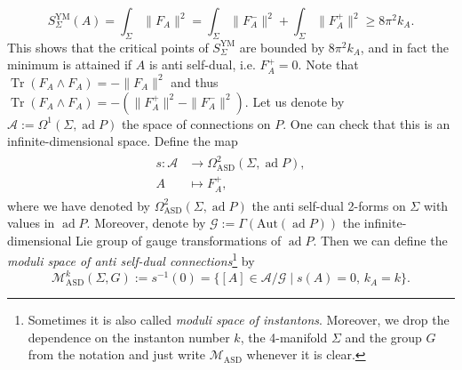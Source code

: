\documentclass[11pt,colorinlistoftodos]{amsart}
\numberwithin{equation}{subsection}
\theoremstyle{plain}
\theoremstyle{definition}
\theoremstyle{remark}
\DeclareMathOperator{\tr}{Tr}
\DeclareMathOperator{\ad}{ad}
\newcommand{\calM}{\mathcal{M}}
\begin{document}
\begin{equation}
    S^\mathrm{YM}_\Sigma(A)=\int_\Sigma\|F_A\|^2=\int_\Sigma\|F_A^-\|^2+\int_\Sigma \|F_A^+\|^2\geq 8\pi^2k_A.
\end{equation}
This shows that the critical points of $S^\mathrm{YM}_\Sigma$ are bounded by $8\pi^2 k_A$, and in fact the minimum is attained if $A$ is anti self-dual, i.e. $F_A^+=0$. Note that $\tr(F_A\land F_A)=-\|F_A\|^2$ and thus $\tr(F_A\land F_A)=-\left(\|F_A^+\|^2-\|F_A^-\|^2\right)$.
Let us denote by $\mathcal{A}:=\Omega^1(\Sigma,\ad P)$ the space of connections on $P$. One can check that this is an infinite-dimensional space. Define the map 
\begin{align}
    \begin{split}
        s\colon \mathcal{A}&\to \Omega^2_{\mathrm{ASD}}(\Sigma,\ad P),\\
        A &\mapsto F_A^+,
    \end{split}
\end{align}
where we have denoted by $\Omega^2_{\mathrm{ASD}}(\Sigma,\ad P)$ the anti self-dual 2-forms on $\Sigma$ with values in $\ad P$.
Moreover, denote by $\mathcal{G}:=\Gamma(\mathrm{Aut}(\ad P))$ the infinite-dimensional Lie group of gauge transformations of $\ad P$. Then we can define the \emph{moduli space of anti self-dual connections}\footnote{Sometimes it is also called \emph{moduli space of instantons}. Moreover, we drop the dependence on the instanton number $k$, the 4-manifold $\Sigma$ and the group $G$ from the notation and just write $\calM_\mathrm{ASD}$ whenever it is clear.} by
\begin{equation}
\label{eq:moduli_ASD}
    \calM^k_{\mathrm{ASD}}(\Sigma,G):=s^{-1}(0)=\{[A]\in \mathcal{A}/\mathcal{G}\mid s(A)=0,\,k_A=k\}.
\end{equation}
\end{document}
